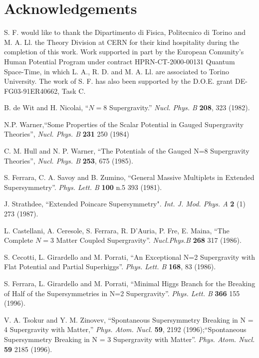 \documentclass[a4paper,12pt]{article}
\begin{document}
\section*{Acknowledgements}

S. F. would like to thank the Dipartimento di Fisica, Politecnico
di Torino and M. A. Ll. the Theory Division at CERN  for their
kind hospitality during the  completion of this work.   Work
supported in part by the European Comunity's Human Potential
Program under contract HPRN-CT-2000-00131 Quantum Space-Time, in
which L. A.,  R. D. and M. A. Ll. are associated to Torino
University. The work of S. F. has also  been supported by the
D.O.E. grant DE-FG03-91ER40662, Task C.



\begin{thebibliography}{99}


B. de Wit and H. Nicolai, ``$N=8$ Supergravity.'' {\it Nucl.
Phys. B} {\bf 208}, 323 (1982).


 N.P. Warner,``Some Properties of the Scalar Potential in
Gauged Supergravity Theories'',  {\it  Nucl. Phys. B} {\bf 231} 250 (1984) 



 C. M. Hull and  N. P. Warner,
``The Potentials of the Gauged N=8 Supergravity Theories'', {\it
Nucl.  Phys. B} {\bf 253}, 675 (1985).

 S. Ferrara, C. A. Savoy and B. Zumino, ``General Massive Multiplets
in Extended Supersymmetry''. {\it Phys. Lett. B} {\bf 100} n.5 393
(1981).

 J. Strathdee, ``Extended Poincare Supersymmetry".
 {\it Int. J. Mod. Phys. A} {\bf 2} (1) 273 (1987).

 L. Castellani, A. Ceresole, S. Ferrara, R. D'Auria, P. Fre, E.
Maina, ``The Complete $N=3$ Matter Coupled Supergravity''. {\it
Nucl.Phys.B} {\bf 268} 317 (1986).


S. Cecotti, L. Girardello and M. Porrati, ``An Exceptional N=2
Supergravity with Flat Potential and Partial Superhiggs''. {\it
Phys. Lett. B} {\bf 168}, 83 (1986).



S. Ferrara, L. Girardello and M. Porrati, ``Minimal Higgs Branch
for the Breaking of Half of the Supersymmetries in N=2
Supergravity''. {\it Phys. Lett. B} {\bf 366}  155 (1996).



V. A. Tsokur and Y. M. Zinovev, ``Spontaneous Supersymmetry
Breaking in N = 4 Supergravity with Matter,'' {\it Phys.  Atom.
Nucl.}  {\bf 59}, 2192 (1996);``Spontaneous Supersymmetry Breaking
in N = 3 Supergravity with Matter''. {\it Phys.  Atom.  Nucl.}
{\bf 59} 2185 (1996).




\end{thebibliography}
\end{document}

